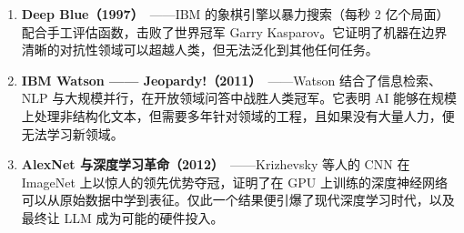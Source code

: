 \documentclass[11pt,a4paper,openany]{book}
\begin{document}
\begin{enumerate}
  \item \textbf{Deep Blue（1997）}~\cite{campbell2002deep}——IBM 的象棋引擎以暴力搜索（每秒 2 亿个局面）配合手工评估函数，击败了世界冠军 Garry Kasparov。它证明了机器在边界清晰的对抗性领域可以超越人类，但无法泛化到其他任何任务。
  \item \textbf{IBM Watson —— Jeopardy!（2011）}~\cite{ferrucci2010building}——Watson 结合了信息检索、NLP 与大规模并行，在开放领域问答中战胜人类冠军。它表明 AI 能够在规模上处理非结构化文本，但需要多年针对领域的工程，且如果没有大量人力，便无法学习新领域。
  \item \textbf{AlexNet 与深度学习革命（2012）}~\cite{krizhevsky2012imagenet}——Krizhevsky 等人的 CNN 在 ImageNet 上以惊人的领先优势夺冠，证明了在 GPU 上训练的深度神经网络可以从原始数据中学到表征。仅此一个结果便引爆了现代深度学习时代，以及最终让 LLM 成为可能的硬件投入。

\end{enumerate}
\end{document}

